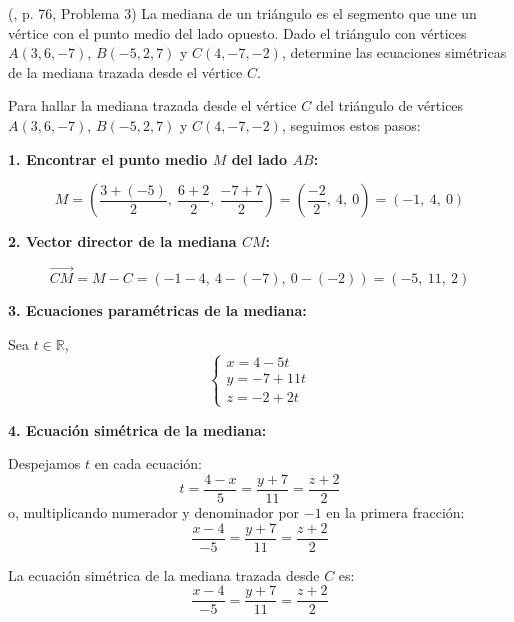 \begin{prob} (\cite{espinoza2006Algebralineal}, p. 76, Problema 3) La mediana de un triángulo es el segmento que une un vértice con el punto medio del lado opuesto. Dado el triángulo con vértices $A(3,6,-7)$, $B(-5,2,7)$ y $C(4,-7,-2)$, determine las ecuaciones simétricas de la mediana trazada desde el vértice $C$. 

\begin{myproof}
Para hallar la mediana trazada desde el vértice $C$ del triángulo de vértices $A(3,6,-7)$, $B(-5,2,7)$ y $C(4,-7,-2)$, seguimos estos pasos:

\textbf{1. Encontrar el punto medio $M$ del lado $AB$:}

\[
M = \left( \frac{3 + (-5)}{2},\ \frac{6 + 2}{2},\ \frac{-7 + 7}{2} \right )
= \left( \frac{-2}{2},\ 4,\ 0 \right )
= (-1,\ 4,\ 0)
\]

\textbf{2. Vector director de la mediana $CM$:}

\[
\vec{CM} = M - C = (-1 - 4,\ 4 - (-7),\ 0 - (-2)) = (-5,\ 11,\ 2)
\]

\textbf{3. Ecuaciones paramétricas de la mediana:}

Sea $t \in \mathbb{R}$,
\[
\begin{cases}
x = 4 - 5t \\
y = -7 + 11t \\
z = -2 + 2t
\end{cases}
\]

\textbf{4. Ecuación simétrica de la mediana:}

Despejamos $t$ en cada ecuación:
\[
t = \frac{4 - x}{5} = \frac{y + 7}{11} = \frac{z + 2}{2}
\]
o, multiplicando numerador y denominador por $-1$ en la primera fracción:
\[
\frac{x - 4}{-5} = \frac{y + 7}{11} = \frac{z + 2}{2}
\]

La ecuación simétrica de la mediana trazada desde $C$ es:
\[
\boxed{
\frac{x - 4}{-5} = \frac{y + 7}{11} = \frac{z + 2}{2}
}
\]
\end{myproof}

\end{prob}

